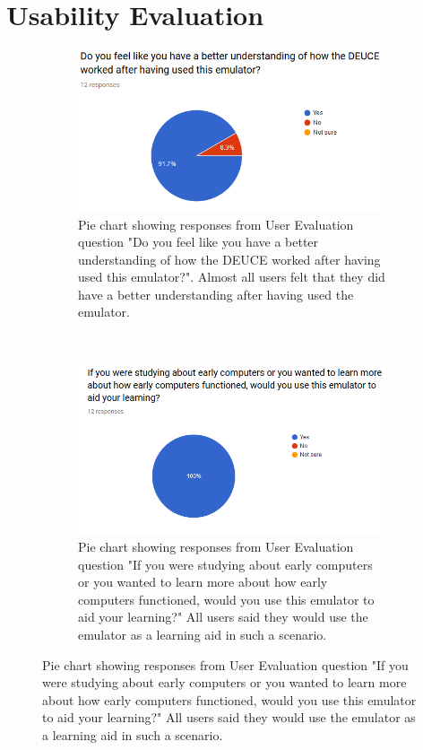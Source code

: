 \documentclass{l4proj}
\begin{document}
\section{Usability Evaluation}

\begin{figure}[!t]
	\centering
	\begin{subfigure}[t]{0.45\textwidth}
		\includegraphics[width=\textwidth]{images/chart-5}
		\caption{Pie chart showing responses from User Evaluation question "Do you feel like you have a better understanding of how the DEUCE worked after having used this emulator?". Almost all users felt that they did have a better understanding after having used the emulator.}
		\label{fig:chart-5}
	\end{subfigure}
	~ %
	\begin{subfigure}[t]{0.45\textwidth}
		\includegraphics[width=\textwidth]{images/chart-6}
		\caption{Pie chart showing responses from User Evaluation question "If you were studying about early computers or you wanted to learn more about how early computers functioned, would you use this emulator to aid your learning?" All users said they would use the emulator as a learning aid in such a scenario.}

\end{subfigure}
\end{figure}
\end{document}

